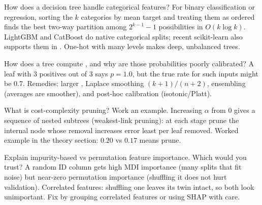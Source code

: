 \begin{qa}{How does a decision tree handle categorical features?}
\why For binary classification or regression, sorting the $k$ categories by mean target and treating them as ordered finds the best
two-way partition among $2^{k-1}-1$ possibilities in $O(k\log k)$. LightGBM and CatBoost do native categorical splits; recent
scikit-learn also supports them in . One-hot with many levels makes deep, unbalanced trees.
\end{qa}

\begin{qa}{How does a tree compute , and why are those probabilities poorly calibrated?}
\why A leaf with 3 positives out of 3 says $p = 1.0$, but the true rate for such inputs might be 0.7. Remedies: larger
, Laplace smoothing $(k+1)/(n+2)$, ensembling (averages are smoother), and post-hoc calibration
(isotonic/Platt).
\end{qa}

\begin{qa}{What is cost-complexity pruning? Work an example.}
\why Increasing $\alpha$ from 0 gives a sequence of nested subtrees (weakest-link pruning): at each stage prune the internal node
whose removal increases error least per leaf removed. Worked example in the theory section: $0.20$ vs $0.17$ means prune.
\end{qa}

\begin{qa}{Explain impurity-based vs permutation feature importance. Which would you trust?}
\why A random ID column gets high MDI importance (many splits that fit noise) but near-zero permutation importance (shuffling it
does not hurt validation). Correlated features: shuffling one leaves its twin intact, so both look unimportant. Fix by grouping
correlated features or using SHAP with care.
\end{qa}

